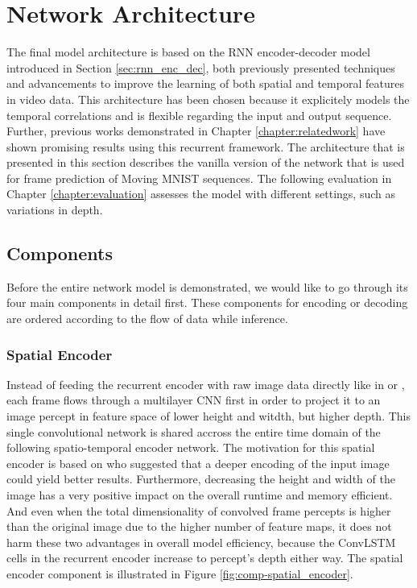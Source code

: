 \section{Network Architecture}

The final model architecture is based on the RNN encoder-decoder model introduced in Section \ref{sec:rnn_enc_dec}, both previously presented techniques and advancements to improve the learning of both spatial and temporal features in video data. This architecture has been chosen because it explicitely models the temporal correlations and is flexible regarding the input and output sequence. Further, previous works demonstrated in Chapter \ref{chapter:relatedwork} have shown promising results using this recurrent framework. The architecture that is presented in this section describes the vanilla version of the network that is used for frame prediction of Moving MNIST sequences. The following evaluation in Chapter \ref{chapter:evaluation} assesses the model with different settings, such as variations in depth.

\subsection{Components}

Before the entire network model is demonstrated, we would like to go through its four main components in detail first. These components for encoding or decoding are ordered according to the flow of data while inference.

\subsubsection{Spatial Encoder}

Instead of feeding the recurrent encoder with raw image data directly like in \parencite{unsup_learn_lstm} or \parencite{conv_lstm_nowcasting}, each frame flows through a multilayer CNN first in order to project it to an image percept in feature space of lower height and witdth, but higher depth. This single convolutional network is shared accross the entire time domain of the following spatio-temporal encoder network. The motivation for this spatial encoder is based on \parencite{spat_temp_video_autoenc} who suggested that a deeper encoding of the input image could yield better results. Furthermore, decreasing the height and width of the image has a very positive impact on the overall runtime and memory efficient. And even when the total dimensionality of convolved frame percepts is higher than the original image due to the higher number of feature maps, it does not harm these two advantages in overall model efficiency, because the ConvLSTM cells in the recurrent encoder increase to percept's depth either way. The spatial encoder component is illustrated in Figure \ref{fig:comp-spatial_encoder}.

